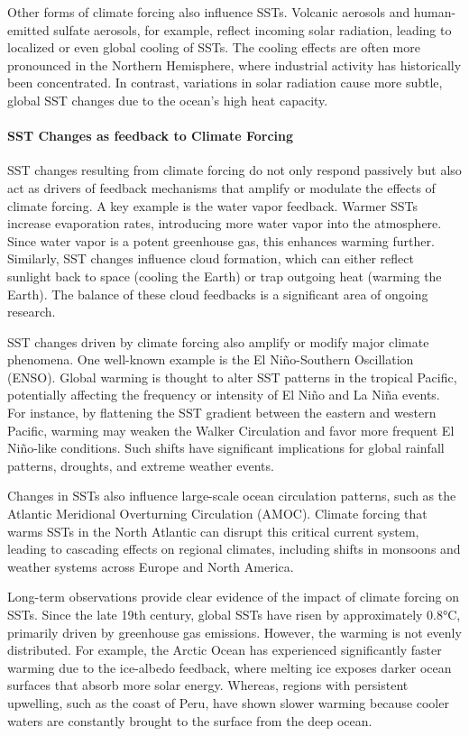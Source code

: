 Other forms of climate forcing also influence SSTs. Volcanic aerosols and human-emitted sulfate aerosols, for example, reflect incoming solar radiation, leading to localized or even global cooling of SSTs. The cooling effects are often more pronounced in the Northern Hemisphere, where industrial activity has historically been concentrated. In contrast, variations in solar radiation cause more subtle, global SST changes due to the ocean’s high heat capacity.

\paragraph{SST Changes as feedback to Climate Forcing}
SST changes resulting from climate forcing do not only respond passively but also act as drivers of feedback mechanisms that amplify or modulate the effects of climate forcing. A key example is the water vapor feedback. Warmer SSTs increase evaporation rates, introducing more water vapor into the atmosphere. Since water vapor is a potent greenhouse gas, this enhances warming further. Similarly, SST changes influence cloud formation, which can either reflect sunlight back to space (cooling the Earth) or trap outgoing heat (warming the Earth). The balance of these cloud feedbacks is a significant area of ongoing research.


SST changes driven by climate forcing also amplify or modify major climate phenomena. One well-known example is the El Niño-Southern Oscillation (ENSO). Global warming is thought to alter SST patterns in the tropical Pacific, potentially affecting the frequency or intensity of El Niño and La Niña events. For instance, by flattening the SST gradient between the eastern and western Pacific, warming may weaken the Walker Circulation and favor more frequent El Niño-like conditions. Such shifts have significant implications for global rainfall patterns, droughts, and extreme weather events.

Changes in SSTs also influence large-scale ocean circulation patterns, such as the Atlantic Meridional Overturning Circulation (AMOC). Climate forcing that warms SSTs in the North Atlantic can disrupt this critical current system, leading to cascading effects on regional climates, including shifts in monsoons and weather systems across Europe and North America.

Long-term observations provide clear evidence of the impact of climate forcing on SSTs. Since the late 19th century, global SSTs have risen by approximately 0.8°C, primarily driven by greenhouse gas emissions. However, the warming is not evenly distributed. For example, the Arctic Ocean has experienced significantly faster warming due to the ice-albedo feedback, where melting ice exposes darker ocean surfaces that absorb more solar energy. Whereas, regions with persistent upwelling, such as the coast of Peru, have shown slower warming because cooler waters are constantly brought to the surface from the deep ocean.


